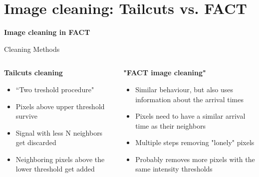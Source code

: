 \section{Image cleaning: Tailcuts vs. FACT}

\begin{frame}
    \centering
    {\Huge \textbf{Image cleaning in FACT}}
\end{frame}

\begin{frame}{Cleaning Methods}
    \begin{columns}[T] %
        \begin{column}{.48\textwidth}
            \textbf{Tailcuts cleaning}
            \vspace{8pt}
            \begin{itemize}
                \item ``Two treshold procedure"
                \item Pixels above upper threshold survive
                \item Signal with less N neighbors get discarded
                \item Neighboring pixels above the lower threshold get added
            \end{itemize}
        \end{column}
        \begin{column}{.48\textwidth}
            \textbf{"FACT image cleaning"}
            \vspace{8pt}
            \begin{itemize}
                \item Similar behaviour, but also uses information about the arrival times
                \item[\rightarrow] Pixels need to have a similar arrival time as their neighbors
                \item Multiple steps removing "lonely" pixels
                \item[\rightarrow] Probably removes more pixels with the same intensity thresholds
            \end{itemize}
        \end{column}
    \end{columns}
\end{frame}

